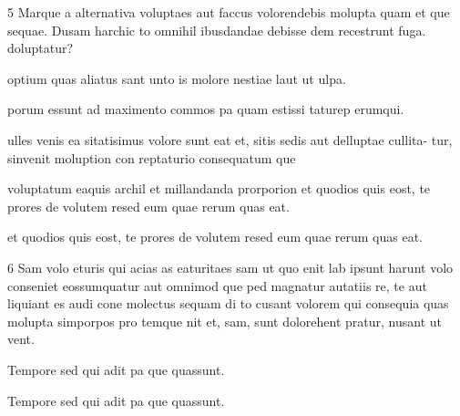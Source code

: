 \begin{multicols}{2}






\end{multicols}



\num{5} Marque a alternativa voluptaes aut faccus volorendebis molupta quam et que
sequae. Dusam harchic to omnihil ibusdandae debisse dem recestrunt fuga.
doluptatur?

\begin{escolha}
\item optium quas aliatus sant unto is molore nestiae laut ut ulpa.
\item porum essunt ad maximento commos pa quam estissi taturep erumqui.
\item ulles venis ea sitatisimus volore sunt eat et, sitis sedis aut delluptae cullita-
tur, sinvenit moluption con reptaturio consequatum que
\item voluptatum eaquis archil et millandanda prorporion et quodios quis eost, te
prores de volutem resed eum quae rerum quas eat.
\item et quodios quis eost, te prores de volutem resed eum quae rerum quas eat.
\end{escolha}

\num{6} Sam volo eturis qui acias as eaturitaes sam ut quo enit lab ipsunt harunt volo
conseniet eossumquatur aut omnimod que ped magnatur autatiis re, te aut
liquiant es audi cone molectus sequam di to cusant volorem qui consequia quas
molupta simporpos pro temque nit et, sam, sunt dolorehent pratur, nusant ut
vent.

\begin{escolha}
\item Tempore sed qui adit pa que quassunt.
\end{escolha}

\linhas

\begin{escolha}
\item Tempore sed qui adit pa que quassunt.
\end{escolha}

